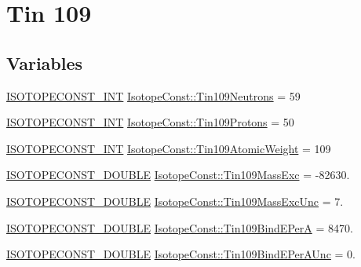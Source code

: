 \hypertarget{group___isotope_const-_tin-_sn109}{}\section{Tin 109}
\label{group___isotope_const-_tin-_sn109}
\subsection*{Variables}
\begin{DoxyCompactItemize}
\item 
\mbox{\hyperlink{group___isotope_const-_macros_ga5f18360b3e99483a35c32d789e62621c}{I\+S\+O\+T\+O\+P\+E\+C\+O\+N\+S\+T\+\_\+\+I\+NT}} \mbox{\hyperlink{group___isotope_const-_tin-_sn109_ga7764747c35db452205cb5056c771fe4c}{Isotope\+Const\+::\+Tin109\+Neutrons}} = 59
\item 
\mbox{\hyperlink{group___isotope_const-_macros_ga5f18360b3e99483a35c32d789e62621c}{I\+S\+O\+T\+O\+P\+E\+C\+O\+N\+S\+T\+\_\+\+I\+NT}} \mbox{\hyperlink{group___isotope_const-_tin-_sn109_ga7b313efb4a51c5b96181fbfa3c7d11e7}{Isotope\+Const\+::\+Tin109\+Protons}} = 50
\item 
\mbox{\hyperlink{group___isotope_const-_macros_ga5f18360b3e99483a35c32d789e62621c}{I\+S\+O\+T\+O\+P\+E\+C\+O\+N\+S\+T\+\_\+\+I\+NT}} \mbox{\hyperlink{group___isotope_const-_tin-_sn109_ga8690df36b418a19e1446d7a9ad2bf14a}{Isotope\+Const\+::\+Tin109\+Atomic\+Weight}} = 109
\item 
\mbox{\hyperlink{group___isotope_const-_macros_ga8f45a7272ce02c0b4c65c44636ed719a}{I\+S\+O\+T\+O\+P\+E\+C\+O\+N\+S\+T\+\_\+\+D\+O\+U\+B\+LE}} \mbox{\hyperlink{group___isotope_const-_tin-_sn109_ga0f6fbebf5f3f00aad521fb4579fe53cb}{Isotope\+Const\+::\+Tin109\+Mass\+Exc}} = -\/82630.
\item 
\mbox{\hyperlink{group___isotope_const-_macros_ga8f45a7272ce02c0b4c65c44636ed719a}{I\+S\+O\+T\+O\+P\+E\+C\+O\+N\+S\+T\+\_\+\+D\+O\+U\+B\+LE}} \mbox{\hyperlink{group___isotope_const-_tin-_sn109_gad2dc1d9b10984c66dc93a41cc1bbb76b}{Isotope\+Const\+::\+Tin109\+Mass\+Exc\+Unc}} = 7.
\item 
\mbox{\hyperlink{group___isotope_const-_macros_ga8f45a7272ce02c0b4c65c44636ed719a}{I\+S\+O\+T\+O\+P\+E\+C\+O\+N\+S\+T\+\_\+\+D\+O\+U\+B\+LE}} \mbox{\hyperlink{group___isotope_const-_tin-_sn109_ga776af5fb9eab381848bb9fb99721522f}{Isotope\+Const\+::\+Tin109\+Bind\+E\+PerA}} = 8470.
\item 
\mbox{\hyperlink{group___isotope_const-_macros_ga8f45a7272ce02c0b4c65c44636ed719a}{I\+S\+O\+T\+O\+P\+E\+C\+O\+N\+S\+T\+\_\+\+D\+O\+U\+B\+LE}} \mbox{\hyperlink{group___isotope_const-_tin-_sn109_ga118387ca6762910d50feb4a6f09a9bd3}{Isotope\+Const\+::\+Tin109\+Bind\+E\+Per\+A\+Unc}} = 0.

\end{DoxyCompactItemize}
